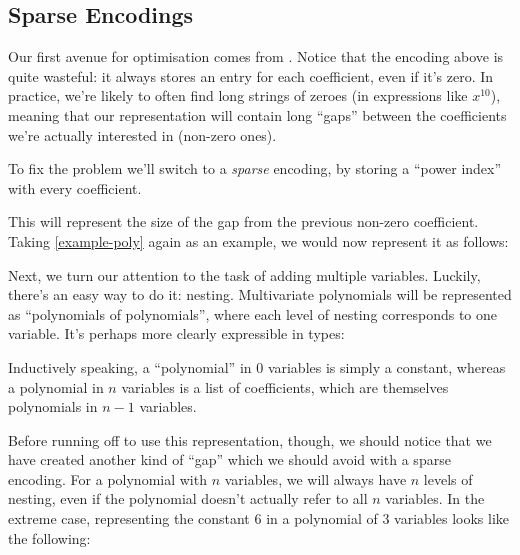 \documentclass[acmsmall,review,anonymous]{acmart}\settopmatter{printfolios=true,printccs=false,printacmref=false}
\begin{document}
\subsection{Sparse Encodings}
Our first avenue for optimisation comes from \citet{gregoire_proving_2005}.
Notice that the encoding above is quite wasteful: it always stores an entry for
each coefficient, even if it's zero. In practice, we're likely to often find
long strings of zeroes (in expressions like \(x^{10}\)), meaning that our
representation will contain long ``gaps'' between the coefficients we're
actually interested in (non-zero ones).

To fix the problem we'll switch to a \emph{sparse} encoding, by storing a
``power index'' with every coefficient.
\begin{center}
\end{center}

This will represent the size of the gap from the previous non-zero coefficient.
Taking \ref{example-poly} again as an example, we would now represent it as
follows: 
\begin{center}
\end{center}

Next, we turn our attention to the task of adding multiple variables. Luckily,
there's an easy way to do it: nesting. Multivariate polynomials will be
represented as ``polynomials of polynomials'', where each level of nesting
corresponds to one variable. It's perhaps more clearly expressible in types:
\begin{center}
\end{center}
Inductively speaking, a ``polynomial'' in 0 variables is simply a constant,
whereas a polynomial in \(n\) variables is a list of coefficients, which are
themselves polynomials in \(n-1\) variables.

Before running off to use this representation, though, we should notice that we
have created another kind of ``gap'' which we should avoid with a sparse
encoding. For a polynomial with \(n\) variables, we will always have \(n\)
levels of nesting, even if the polynomial doesn't actually refer to all \(n\)
variables. In the extreme case, representing the constant \(6\) in a polynomial
of 3 variables looks like the following:
\begin{center}
\end{center}
\end{document}

